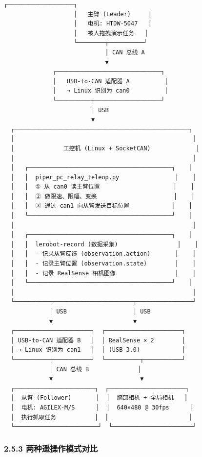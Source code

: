 \documentclass[UTF8,a4paper,11pt]{ctexart}
\begin{document}
\begin{lstlisting}[language=text]
                    ┌───────────────────┐
                    │   主臂 (Leader)     │
                    │   电机: HTDW-5047   │
                    │   被人拖拽演示任务   │
                    └────────┬──────────┘
                             │ CAN 总线 A
                             ▼
              ┌──────────────────────────────┐
              │   USB-to-CAN 适配器 A          │
              │   → Linux 识别为 can0          │
              └──────────┬───────────────────┘
                         │ USB
                         ▼
  ┌──────────────────────────────────────────────────┐
  │                                                   │
  │              工控机 (Linux + SocketCAN)             │
  │                                                   │
  │   ┌─────────────────────────────────────────┐    │
  │   │  piper_pc_relay_teleop.py                │    │
  │   │  ① 从 can0 读主臂位置                     │    │
  │   │  ② 做限速、限幅、变换                      │    │
  │   │  ③ 通过 can1 向从臂发送目标位置            │    │
  │   └─────────────────────────────────────────┘    │
  │                                                   │
  │   ┌─────────────────────────────────────────┐    │
  │   │  lerobot-record (数据采集)                 │    │
  │   │  - 记录从臂反馈 (observation.action)       │    │
  │   │  - 记录主臂位置 (observation.state)        │    │
  │   │  - 记录 RealSense 相机图像                 │    │
  │   └─────────────────────────────────────────┘    │
  │                                                   │
  └──────────┬───────────────────────┬────────────────┘
             │ USB                   │ USB
             ▼                       ▼
  ┌──────────────────────┐  ┌──────────────────────┐
  │ USB-to-CAN 适配器 B   │  │ RealSense × 2        │
  │ → Linux 识别为 can1   │  │ (USB 3.0)            │
  └──────────┬───────────┘  └──────────┬───────────┘
             │ CAN 总线 B              │
             ▼                         ▼
  ┌───────────────────────┐  ┌──────────────────────┐
  │  从臂 (Follower)       │  │  腕部相机 + 全局相机   │
  │  电机: AGILEX-M/S      │  │  640×480 @ 30fps      │
  │  执行抓取任务           │  │                       │
  └────────────────────────┘  └───────────────────────┘
\end{lstlisting}

\subsubsection{2.5.3 两种遥操作模式对比}
\end{document}
